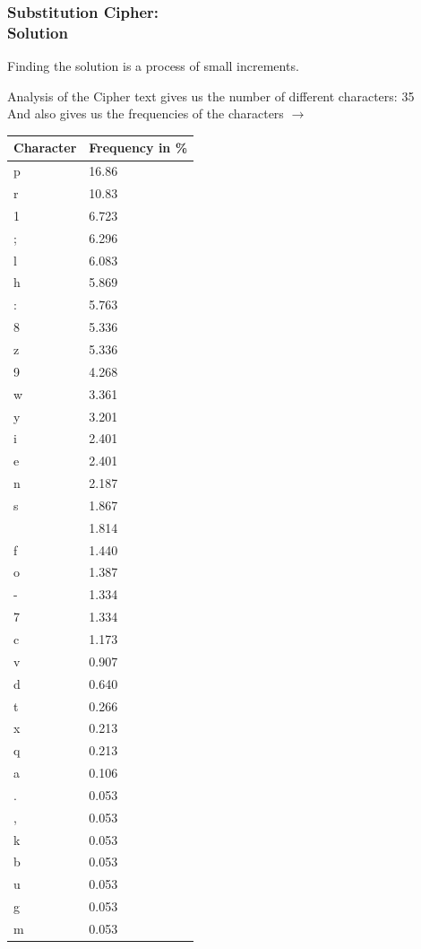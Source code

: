 \documentclass{uva-inf-presentation}
\begin{document}
\begin{frame}
\frametitle{Substitution Cipher:\\ Solution}
Finding the solution is a process of small increments.

\begin{minipage}{0.55\linewidth}
Analysis of the Cipher text gives us the number of different characters:
35\\
And also gives us the frequencies of the characters $\rightarrow$
\end{minipage}%
\begin{minipage}{0.45\linewidth}
\centering
{\fontsize{3.5pt}{4.5pt}\selectfont
\begin{tabular}{ll}\toprule
Character & Frequency in \%     \\
\midrule
p         & 16.86 \\
r         & 10.83 \\
1         & 6.723 \\
;         & 6.296 \\
l         & 6.083 \\
h         & 5.869 \\
:         & 5.763 \\
8         & 5.336 \\
z         & 5.336 \\
9         & 4.268 \\
w         & 3.361 \\
y         & 3.201 \\
i         & 2.401 \\
e         & 2.401 \\
n         & 2.187 \\
s         & 1.867 \\
          & 1.814 \\
f         & 1.440 \\
o         & 1.387 \\
-         & 1.334 \\
7         & 1.334 \\
c         & 1.173 \\
v         & 0.907 \\
d         & 0.640 \\
t         & 0.266 \\
x         & 0.213 \\
q         & 0.213 \\
a         & 0.106 \\
.         & 0.053 \\
,         & 0.053 \\
k         & 0.053 \\
b         & 0.053 \\
u         & 0.053 \\
g         & 0.053 \\
m         & 0.053 \\ \bottomrule
\end{tabular}}
\end{minipage}
\end{frame}
\end{document}
